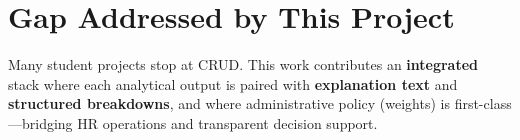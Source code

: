 \section{Gap Addressed by This Project}
Many student projects stop at CRUD. This work contributes an \textbf{integrated} stack where each analytical output is paired with \textbf{explanation text} and \textbf{structured breakdowns}, and where administrative policy (weights) is first-class---bridging HR operations and transparent decision support.
